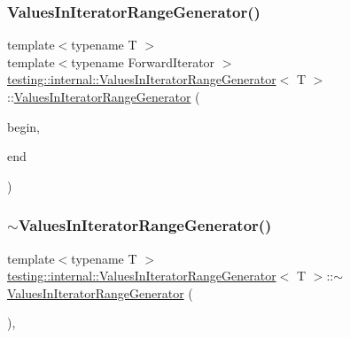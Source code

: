 \subsubsection{\texorpdfstring{ValuesInIteratorRangeGenerator()}{ValuesInIteratorRangeGenerator()}\hspace{0.1cm}{\footnotesize\ttfamily [2/3]}}
{\footnotesize\ttfamily template$<$typename T $>$ \\
template$<$typename Forward\+Iterator $>$ \\
\mbox{\hyperlink{classtesting_1_1internal_1_1_values_in_iterator_range_generator}{testing\+::internal\+::\+Values\+In\+Iterator\+Range\+Generator}}$<$ T $>$\+::\mbox{\hyperlink{classtesting_1_1internal_1_1_values_in_iterator_range_generator}{Values\+In\+Iterator\+Range\+Generator}} (\begin{DoxyParamCaption}\item[{Forward\+Iterator}]{begin,  }\item[{Forward\+Iterator}]{end }\end{DoxyParamCaption})\hspace{0.3cm}{\ttfamily [inline]}}

\mbox{\label{classtesting_1_1internal_1_1_values_in_iterator_range_generator_a9070d5b79803164625d3aa77a1659e9f}} 
\subsubsection{\texorpdfstring{$\sim$ValuesInIteratorRangeGenerator()}{~ValuesInIteratorRangeGenerator()}\hspace{0.1cm}{\footnotesize\ttfamily [2/3]}}
{\footnotesize\ttfamily template$<$typename T $>$ \\
\mbox{\hyperlink{classtesting_1_1internal_1_1_values_in_iterator_range_generator}{testing\+::internal\+::\+Values\+In\+Iterator\+Range\+Generator}}$<$ T $>$\+::$\sim$\mbox{\hyperlink{classtesting_1_1internal_1_1_values_in_iterator_range_generator}{Values\+In\+Iterator\+Range\+Generator}} (\begin{DoxyParamCaption}{ }\end{DoxyParamCaption})\hspace{0.3cm}{\ttfamily [inline]}, {\ttfamily [override]}}

